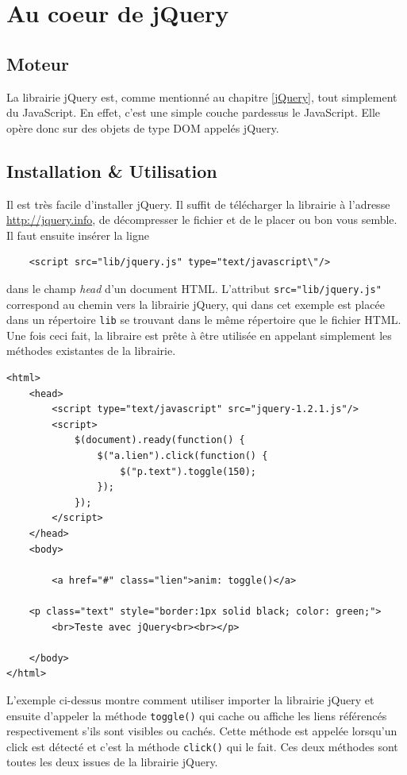 \documentclass[10pt,a4paper,titlepage]{article}
\begin{document}
\newpage
\renewcommand{\labelitemi}{$\bullet$}
\section{Au coeur de jQuery}
\subsection{Moteur}
La librairie jQuery est, comme mentionné au chapitre \ref{jQuery}, tout simplement du JavaScript. En effet, c'est une simple couche pardessus le JavaScript. Elle opère donc sur des objets de type DOM appelés jQuery.



\subsection{Installation \& Utilisation}\label{install}
Il est très facile d'installer jQuery. Il suffit de télécharger la librairie à l'adresse \url{http://jquery.info}, de décompresser le fichier et de le placer ou bon vous semble. Il faut ensuite insérer la ligne
\begin{lstlisting}
	<script src="lib/jquery.js" type="text/javascript\"/>
\end{lstlisting}
dans le champ \emph{head} d'un document HTML. L'attribut \texttt{src="lib/jquery.js"} correspond au chemin vers la librairie jQuery, qui dans cet exemple est placée dans un répertoire \texttt{lib} se trouvant dans le même répertoire que le fichier HTML.\\

Une fois ceci fait, la libraire est prête à être utilisée en appelant simplement les méthodes existantes de la librairie.

\begin{lstlisting}
<html>
	<head>
		<script type="text/javascript" src="jquery-1.2.1.js"/>
		<script>
			$(document).ready(function() {		
				$("a.lien").click(function() {
					$("p.text").toggle(150);
				});
			});
		</script>
	</head>
	<body>

		<a href="#" class="lien">anim: toggle()</a>

	<p class="text" style="border:1px solid black; color: green;">
		<br>Teste avec jQuery<br><br></p>
		
	</body>
</html>
\end{lstlisting}

L'exemple ci-dessus montre comment utiliser importer la librairie jQuery et ensuite d'appeler la méthode \texttt{toggle()} qui cache ou affiche les liens référencés respectivement s'ils sont visibles ou cachés. Cette méthode est appelée lorsqu'un click est détecté et c'est la méthode \texttt{click()} qui le fait. Ces deux méthodes sont toutes les deux issues de la librairie jQuery.
\end{document}

